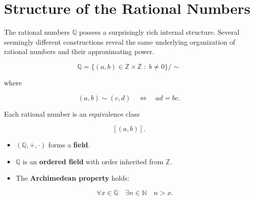 
\section{Structure of the Rational Numbers}

\begin{remark}

The rational numbers $\mathbb{Q}$ possess a surprisingly rich internal
structure.  Several seemingly different constructions reveal the same
underlying organization of rational numbers and their approximating
power.

\end{remark}


\begin{tcolorbox}[colback=gray!6, colframe=gray!40, arc=2pt,
title={Construction of $\mathbb{Q}$}]

\[
\mathbb{Q}
=
\{(a,b)\in\mathbb{Z}\times\mathbb{Z}\;:\; b\neq0\}/\sim
\]

where

\[
(a,b)\sim(c,d)
\quad\Longleftrightarrow\quad
ad=bc.
\]

Each rational number is an equivalence class

\[
[(a,b)].
\]

\end{tcolorbox}

\medskip


\begin{tcolorbox}[colback=gray!6, colframe=gray!40, arc=2pt,
title={Algebraic Structure}]

\begin{itemize}

\item $(\mathbb{Q},+,\cdot)$ forms a \textbf{field}.

\item $\mathbb{Q}$ is an \textbf{ordered field} with order inherited
from $\mathbb{Z}$.

\item The \textbf{Archimedean property} holds:

\[
\forall x\in\mathbb{Q}
\quad
\exists n\in\mathbb{N}
\quad
n>x.
\]

\end{itemize}

\end{tcolorbox}


